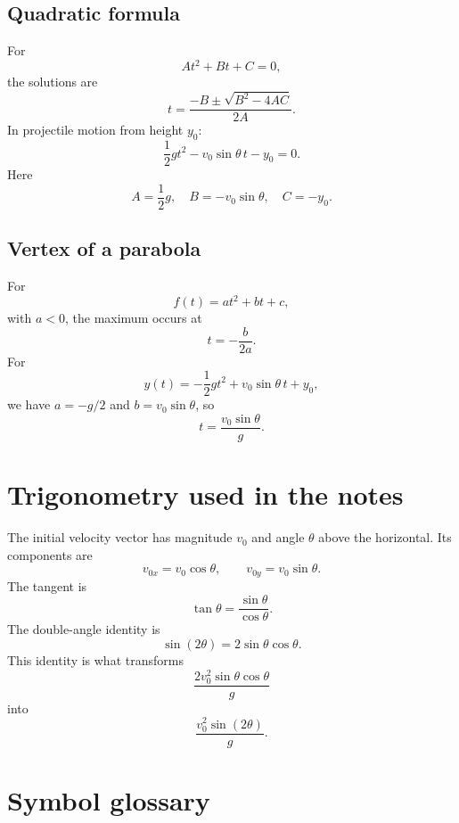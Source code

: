 \documentclass[11pt,a4paper]{article}
\begin{document}
\subsection{Quadratic formula}

For
\[
At^2+Bt+C=0,
\]
the solutions are
\[
t=\frac{-B\pm\sqrt{B^2-4AC}}{2A}.
\]
In projectile motion from height $y_0$:
\[
\frac12gt^2-v_0\sin\theta\,t-y_0=0.
\]
Here
\[
A=\frac12g,
\quad
B=-v_0\sin\theta,
\quad
C=-y_0.
\]

\subsection{Vertex of a parabola}

For
\[
f(t)=at^2+bt+c,
\]
with $a<0$, the maximum occurs at
\[
t=-\frac{b}{2a}.
\]
For
\[
y(t)=-\frac12gt^2+v_0\sin\theta\,t+y_0,
\]
we have $a=-g/2$ and $b=v_0\sin\theta$, so
\[
t=\frac{v_0\sin\theta}{g}.
\]

\section{Trigonometry used in the notes}

The initial velocity vector has magnitude $v_0$ and angle $\theta$ above the horizontal. Its components are
\[
v_{0x}=v_0\cos\theta,
\qquad
v_{0y}=v_0\sin\theta.
\]
The tangent is
\[
\tan\theta=\frac{\sin\theta}{\cos\theta}.
\]
The double-angle identity is
\[
\sin(2\theta)=2\sin\theta\cos\theta.
\]
This identity is what transforms
\[
\frac{2v_0^2\sin\theta\cos\theta}{g}
\]
into
\[
\frac{v_0^2\sin(2\theta)}{g}.
\]

\section{Symbol glossary}
\end{document}
